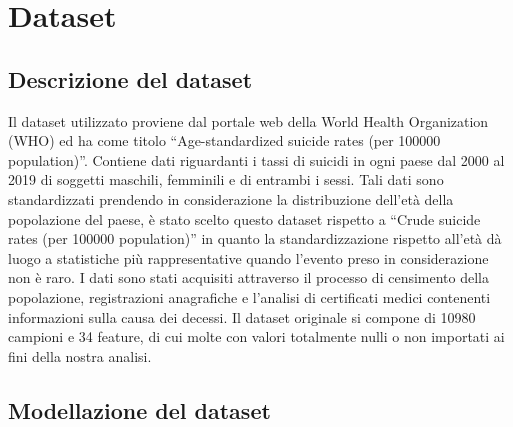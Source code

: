 \documentclass[conference]{IEEEtran}
\begin{document}
\section{Dataset}

\subsection{Descrizione del dataset}

Il dataset utilizzato proviene dal portale web della World Health Organization (WHO)
ed ha come titolo ``Age-standardized suicide rates (per 100000 population)''\cite{b4}.
Contiene dati riguardanti i tassi di suicidi in ogni paese dal 2000 al 2019 di soggetti
maschili, femminili e di entrambi i sessi. Tali dati sono standardizzati
prendendo in considerazione la distribuzione dell'età della popolazione del paese,
è stato scelto questo dataset rispetto a ``Crude suicide rates (per 100000 population)''
in quanto la standardizzazione rispetto all'età dà luogo a statistiche più rappresentative
quando l'evento preso in considerazione non è raro\cite{b5}.
I dati sono stati acquisiti attraverso il processo di censimento della popolazione,
registrazioni anagrafiche e l'analisi di certificati medici contenenti informazioni
sulla causa dei decessi.
Il dataset originale si compone di 10980 campioni e 34 feature,
di cui molte con valori totalmente nulli o non importati ai fini della nostra analisi.

\subsection{Modellazione del dataset}
\end{document}
